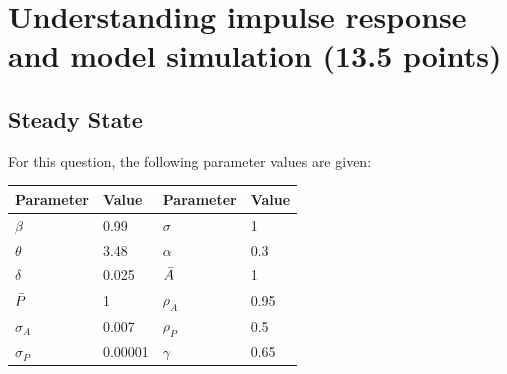 \documentclass[a4paper,11pt]{article}
\begin{document}
\section{Understanding impulse response and model simulation (13.5 points)}
\subsection{Steady State}
For this question, the following parameter values are given:

\begin{longtable}[c]{@{}ll|ll@{}}
\toprule
Parameter    & Value   &Parameter    & Value  \\* \midrule
\endfirsthead
\endhead
\bottomrule
\endfoot
\endlastfoot
$\beta$ & 0.99 & $\sigma$ & 1 \\
$\theta$ & 3.48 & $\alpha$ & 0.3 \\
$\delta$ & 0.025 & $\Bar{A}$ & 1 \\
$\Bar{P}$ & 1 & $\rho_A$ & 0.95 \\
$\sigma_A$ & 0.007 &$\rho_P$ & 0.5 \\
$\sigma_P$ & 0.00001 & $\gamma$ & 0.65  \\* \bottomrule
\end{longtable}
\end{document}
